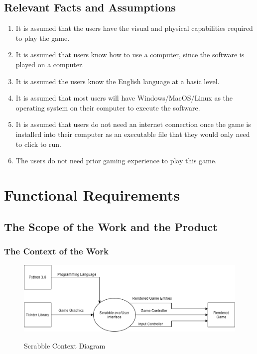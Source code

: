 \documentclass[12pt, titlepage]{article}
\begin{document}
\subsection{Relevant Facts and Assumptions}
\begin{enumerate}
    \item It is assumed that the users have the visual and physical capabilities required to play the game.
    \item It is assumed that users know how to use a computer, since the software is played on a computer.
    \item It is assumed the users know the English language at a basic level.
    \item It is assumed that most users will have Windows/MacOS/Linux as the operating system on their computer to execute the software. 
    \item It is assumed that users do not need an internet connection once the game is installed into their computer as an executable file that they would only need to click to run.
    \item The users do not need prior gaming experience to play this game.
\end{enumerate}


\section{Functional Requirements}

\subsection{The Scope of the Work and the Product} 

\subsubsection{The Context of the Work} %
%
\begin{figure}[ht]
\centering
\includegraphics{SRS/srs_context_of_work.png}\\
\caption{Scrabble Context Diagram}
\end{figure}
\end{document}
